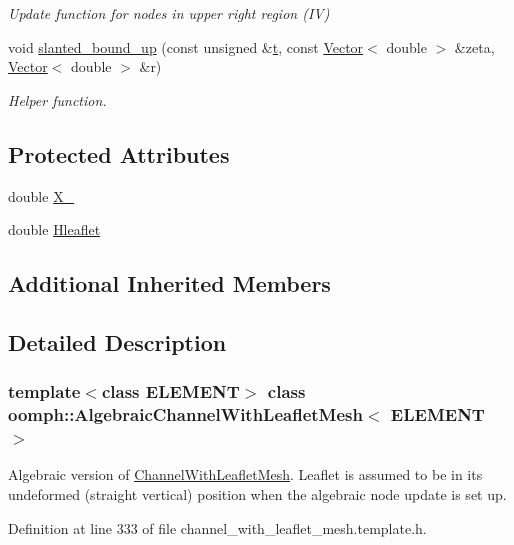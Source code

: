 \begin{DoxyCompactItemize}
\begin{DoxyCompactList}\small\item\em Update function for nodes in upper right region (IV) \end{DoxyCompactList}\item 
void \hyperlink{classoomph_1_1AlgebraicChannelWithLeafletMesh_ab3659949ea5faac4ffa981828e98cf53}{slanted\+\_\+bound\+\_\+up} (const unsigned \&\hyperlink{cfortran_8h_af6f0bd3dc13317f895c91323c25c2b8f}{t}, const \hyperlink{classoomph_1_1Vector}{Vector}$<$ double $>$ \&zeta, \hyperlink{classoomph_1_1Vector}{Vector}$<$ double $>$ \&r)
\begin{DoxyCompactList}\small\item\em Helper function. \end{DoxyCompactList}\end{DoxyCompactItemize}
\subsection*{Protected Attributes}
\begin{DoxyCompactItemize}
\item 
double \hyperlink{classoomph_1_1AlgebraicChannelWithLeafletMesh_a1577beb584df4ad0f8517563934855fc}{X\+\_}
\item 
double \hyperlink{classoomph_1_1AlgebraicChannelWithLeafletMesh_a22e6274b52941ae60cbe66287dd02fb4}{Hleaflet}
\end{DoxyCompactItemize}
\subsection*{Additional Inherited Members}


\subsection{Detailed Description}
\subsubsection*{template$<$class E\+L\+E\+M\+E\+NT$>$\newline
class oomph\+::\+Algebraic\+Channel\+With\+Leaflet\+Mesh$<$ E\+L\+E\+M\+E\+N\+T $>$}

Algebraic version of \hyperlink{classoomph_1_1ChannelWithLeafletMesh}{Channel\+With\+Leaflet\+Mesh}. Leaflet is assumed to be in its undeformed (straight vertical) position when the algebraic node update is set up. 

Definition at line 333 of file channel\+\_\+with\+\_\+leaflet\+\_\+mesh.\+template.\+h.



